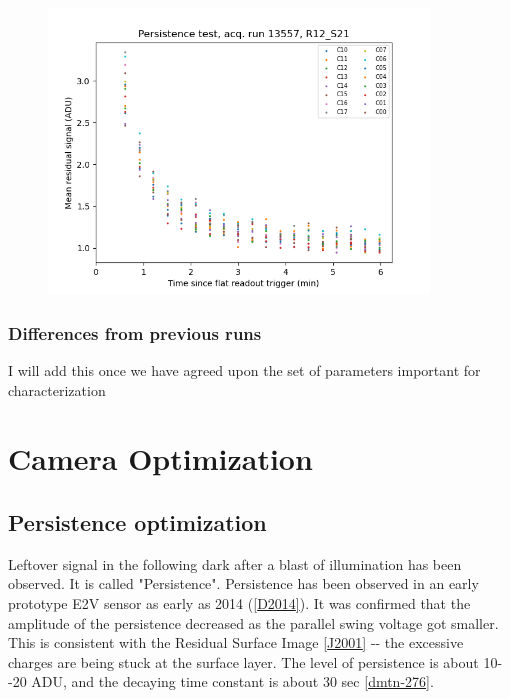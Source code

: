 \begin{figure}
\begin{centering}
\includegraphics[width=0.9\textwidth]{sections/figures/baselineCharacterization/persistence_plot_LSSTCam_R12_S21_u_lsstccs_eo_persistence_13557_w_2023_41_20231118T050437Z.png}
\end{centering}
\end{figure}

\subsubsection{Differences from previous runs}\label{differences-from-previous-runs}

I will add this once we have agreed upon the set of parameters important
for characterization


\section{Camera Optimization}\label{camera-optimization}

\subsection{Persistence optimization}\label{persistence-optimization}

Leftover signal in the following dark after a blast of illumination has
been observed. It is called "Persistence". Persistence has been observed
in an early prototype E2V sensor as early as 2014
(\hyperref[D2014]{{[}D2014{]}}). It was confirmed that the amplitude of
the persistence decreased as the parallel swing voltage got smaller.
This is consistent with the Residual Surface Image
\hyperref[J2001]{{[}J2001{]}} -\/- the excessive charges are being stuck
at the surface layer. The level of persistence is about 10-\/-20 ADU,
and the decaying time constant is about 30 sec
\hyperref[dmtn-276]{{[}dmtn-276{]}}.

